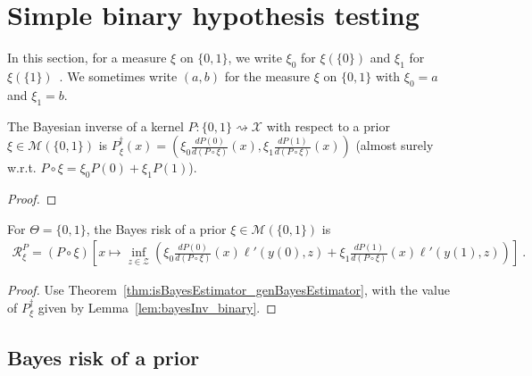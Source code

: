 \section{Simple binary hypothesis testing}

In this section, for a measure $\xi$ on $\{0,1\}$, we write $\xi_0$ for $\xi(\{0\})$ and $\xi_1$ for $\xi(\{1\})$~. We sometimes write $(a,b)$ for the measure $\xi$ on $\{0,1\}$ with $\xi_0 = a$ and $\xi_1 = b$.

\begin{lemma}
  \label{lem:bayesInv_binary}
  \mathlibok
  The Bayesian inverse of a kernel $P : \{0,1\} \rightsquigarrow \mathcal X$ with respect to a prior $\xi \in \mathcal M(\{0,1\})$ is $P_\xi^\dagger(x) = \left(\xi_0\frac{d P(0)}{d(P \circ \xi)}(x), \xi_1\frac{d P(1)}{d(P \circ \xi)}(x)\right)$ (almost surely w.r.t. $P \circ \xi = \xi_0 P(0) + \xi_1 P(1)$).
\end{lemma}

\begin{proof}\mathlibok
{}

\end{proof}

\begin{lemma}
  \label{lem:bayesRisk_binary}
  \leanok
  For $\Theta = \{0,1\}$, the Bayes risk of a prior $\xi \in \mathcal M(\{0,1\})$ is
  \begin{align*}
  \mathcal R^P_\xi = (P \circ \xi)\left[x \mapsto \inf_{z \in \mathcal Z} \left( \xi_0\frac{d P(0)}{d(P \circ \xi)}(x)\ell'(y(0), z) + \xi_1\frac{d P(1)}{d(P \circ \xi)}(x)\ell'(y(1), z) \right) \right]
  \: .
  \end{align*}
\end{lemma}

\begin{proof}\leanok
{}
Use Theorem~\ref{thm:isBayesEstimator_genBayesEstimator}, with the value of $P_\xi^\dagger$ given by Lemma~\ref{lem:bayesInv_binary}.
\end{proof}



\subsection{Bayes risk of a prior}

